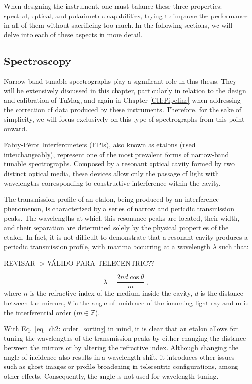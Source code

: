 \documentclass[12pt]{mythesis}
\begin{document}
When designing the instrument, one must balance these three properties: spectral, optical, and polarimetric capabilities, trying to improve the performance in all of them without sacrificing too much. In the following sections, we will delve into each of these aspects in more detail.

\subsection{Spectroscopy}

Narrow-band tunable spectrographs play a significant role in this thesis. They will be extensively discussed in this chapter, particularly in relation to the design and calibration of TuMag, and again in Chapter \ref{CH:Pipeline} when addressing the correction of data produced by these instruments. Therefore, for the sake of simplicity, we will focus exclusively on this type of spectrographs from this point onward.

Fabry-Pérot Interferometers (FPIs), also known as etalons (used interchangeably), represent one of the most prevalent forms of narrow-band tunable spectrographs. Composed by a resonant optical cavity formed by two distinct optical media, these devices allow only the passage of light with wavelengths corresponding to constructive interference within the cavity. 

The transmission profile of an etalon, being produced by an interference phenomenon, is characterized by a series of narrow and periodic transmission peaks. The wavelengths at which this resonance peaks are located, their width, and their separation are determined solely by the physical properties of the etalon. In fact, it is not difficult to demonstrate \citep{franI} that a resonant cavity produces a periodic transmission profile, with maxima occurring at a wavelength $\lambda$ such that:

REVISAR -> VÁLIDO PARA TELECENTRIC?? 

\begin{equation}
\lambda = \frac{2nd\cos \theta}{m}\ ,
\label{eq_ch2: order_sorting}
\end{equation}
where $n$ is the refractive index of the medium inside the cavity, $d$ is the distance between the mirrors, $\theta$ is the angle of incidence of the incoming light ray and m is the interferential order ($m \in \mathbb{Z} $). 

With Eq.~\eqref{eq_ch2: order_sorting} in mind, it is clear that an etalon allows for tuning the wavelengths of the transmission peaks by either changing the distance between the mirrors or by altering the refractive index. Although changing the angle of incidence also results in a wavelength shift, it introduces other issues, such as ghost images or profile broadening in telecentric configurations, among other effects. Consequently, the angle is not used for wavelength tuning.
\end{document}
